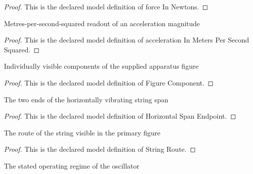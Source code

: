 \begin{proof}
  This is the declared model definition of force In Newtons.
\end{proof}
\begin{definition}
  \label{def:physics:phyx-mini-0204:phyxminiproblems-problemphyxmini0204-accelerationinmeterspersecondsquared}
  Metres-per-second-squared readout of an acceleration magnitude
\end{definition}
\begin{proof}
  This is the declared model definition of acceleration In Meters Per Second Squared.
\end{proof}
\begin{definition}
  \label{def:physics:phyx-mini-0204:phyxminiproblems-problemphyxmini0204-figurecomponent}
  Individually visible components of the supplied apparatus figure
\end{definition}
\begin{proof}
  This is the declared model definition of Figure Component.
\end{proof}
\begin{definition}
  \label{def:physics:phyx-mini-0204:phyxminiproblems-problemphyxmini0204-horizontalspanendpoint}
  The two ends of the horizontally vibrating string span
\end{definition}
\begin{proof}
  This is the declared model definition of Horizontal Span Endpoint.
\end{proof}
\begin{definition}
  \label{def:physics:phyx-mini-0204:phyxminiproblems-problemphyxmini0204-stringroute}
  The route of the string visible in the primary figure
\end{definition}
\begin{proof}
  This is the declared model definition of String Route.
\end{proof}
\begin{definition}
  \label{def:physics:phyx-mini-0204:phyxminiproblems-problemphyxmini0204-oscillatorregime}
  The stated operating regime of the oscillator
\end{definition}

